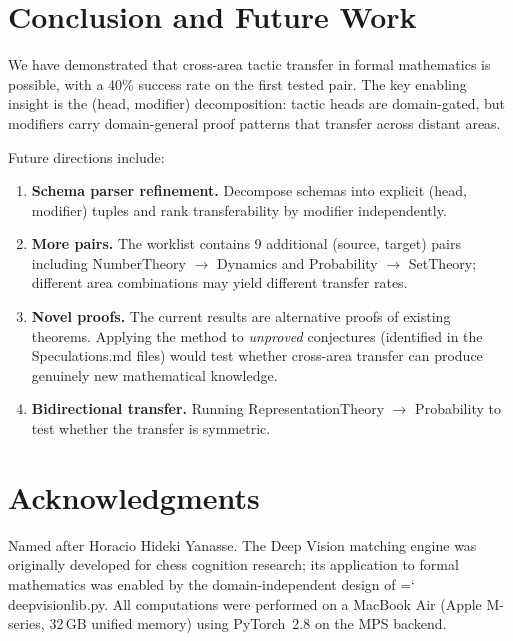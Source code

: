\documentclass[11pt]{article}
\renewcommand{\texttt}[1]{%
  \begingroup\ttfamily\hyphenchar\font=`\-\relax
  \def\_{\textunderscore\discretionary{}{}{}}%
  #1\endgroup}
\theoremstyle{definition}
\theoremstyle{remark}
\begin{document}
\section{Conclusion and Future Work}\label{sec:conclusion}

We have demonstrated that cross-area tactic transfer in formal
mathematics is possible, with a 40\% success rate on the first
tested pair.  The key enabling insight is the (head, modifier)
decomposition: tactic heads are domain-gated, but modifiers carry
domain-general proof patterns that transfer across distant areas.

Future directions include:

\begin{enumerate}
\item \textbf{Schema parser refinement.}  Decompose schemas into
  explicit (head, modifier) tuples and rank transferability by
  modifier independently.
\item \textbf{More pairs.}  The worklist contains 9 additional
  (source, target) pairs including NumberTheory $\to$ Dynamics and
  Probability $\to$ SetTheory; different area combinations may
  yield different transfer rates.
\item \textbf{Novel proofs.}  The current results are alternative
  proofs of existing theorems.  Applying the method to
  \emph{unproved} conjectures (identified in the Speculations.md
  files) would test whether cross-area transfer can produce
  genuinely new mathematical knowledge.
\item \textbf{Bidirectional transfer.}  Running
  RepresentationTheory $\to$ Probability to test whether the
  transfer is symmetric.
\end{enumerate}

\section*{Acknowledgments}

Named after Horacio Hideki Yanasse.  The Deep Vision matching engine
was originally developed for chess cognition research; its
application to formal mathematics was enabled by the domain-independent
design of \texttt{deep\_vision\_lib.py}.  All computations were
performed on a MacBook Air (Apple M-series, 32\,GB unified memory)
using PyTorch~2.8 on the MPS backend.
\end{document}
